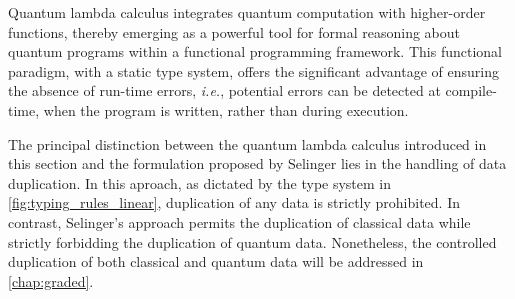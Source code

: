 
Quantum lambda calculus integrates quantum computation with higher-order functions, thereby emerging as a powerful tool for formal reasoning about quantum programs within a functional programming framework. This functional paradigm, with a static type system, offers the significant advantage of ensuring the absence of run-time errors, \textit{i.e.}, potential errors can be detected at compile-time, when the program is written, rather than during execution.

The principal distinction between the quantum lambda calculus introduced in this section and the formulation proposed by Selinger \cite{selinger2006lambda,selinger2009quantum} lies in the handling of data duplication. In this aproach, as dictated by the type system in \autoref{fig:typing_rules_linear}, duplication of any data is strictly prohibited. In contrast, Selinger's approach permits the duplication of classical data while strictly forbidding the duplication of quantum data.
Nonetheless, the controlled duplication of both classical and quantum data will be addressed in \autoref{chap:graded}.



